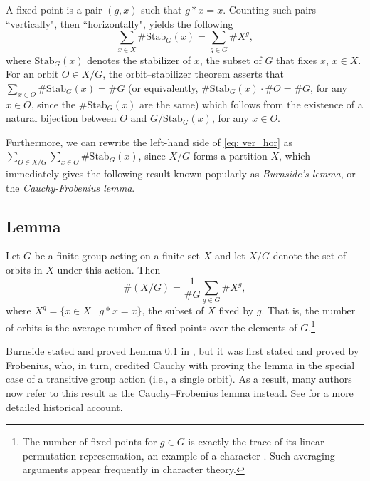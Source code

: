 \documentclass[a4paper,11pt]{article}
\numberwithin{equation}{section}
\begin{document}
    A fixed point is a pair $(g,x)$ such that $g*x = x$. Counting such pairs ``vertically", then ``horizontally", yields the following 
    \begin{equation}
        \sum_{x\in X} \# \text{Stab}_G(x)  = \sum_{g\in G} \# X^g,   \label{eq: ver_hor}\tag{1.1}
    \end{equation} where $\text{Stab}_G(x)$ denotes the stabilizer of $x$, the subset of $G$ that fixes $x$, $x\in X$. For an orbit $O\in X/G$, the orbit--stabilizer theorem asserts that $\sum_{x\in O} \# \text{Stab}_G(x) = \#G$ (or equivalently, $\#\text{Stab}_G(x)\cdot \#O = \#G$, for any $x\in O$, since the $\# \text{Stab}_G(x)$ are the same) which follows from the existence of a natural bijection between $O$ and $G/\text{Stab}_G(x)$, for any $x\in O$.  \smallskip
    
    Furthermore, we can rewrite the left-hand side of \eqref{eq: ver_hor} as \break $\sum_{O \in X/G} \sum_{x\in O} \# \text{Stab}_{G}(x)$, since $X/G$ forms a partition $X$, which immediately gives the following result known popularly as \textit{Burnside's lemma}, or the \textit{Cauchy-Frobenius lemma}.
    \subsection{Lemma} \label{lemma: burnside's} Let $G$ be a finite group acting on a finite set $X$ and let $X/G$ denote the set of orbits in $X$ under this action. Then \begin{equation*}
        \# (X \text{/} G) = \frac{1}{\# G} \sum_{g\in G} \# X^{g}, \label{eq: ch2} \tag{1.2}
    \end{equation*}  where $X^{g}=\{ x\in X \mid g*x=x \}$, the subset of $X$ fixed by $g$. That is, the number of orbits is the average number of fixed points over the elements of $G$.\footnote{The number of fixed points for $g\in G$ is exactly the trace of its linear permutation representation, an example of a character \cite{wiki:Permutation_representation}. Such averaging arguments appear frequently in character theory.} \medskip

    Burnside stated and proved Lemma \ref{lemma: burnside's} in \cite[Sects. 118–119]{Burnside1911},  but it was
    first stated and proved by Frobenius, who, in turn, credited Cauchy with proving the lemma in the special case of a transitive group action (i.e., a single orbit). As a result, many authors now refer to this result as the Cauchy–Frobenius lemma instead. See \cite{Neumann1979} for a more detailed historical account.
\end{document}
